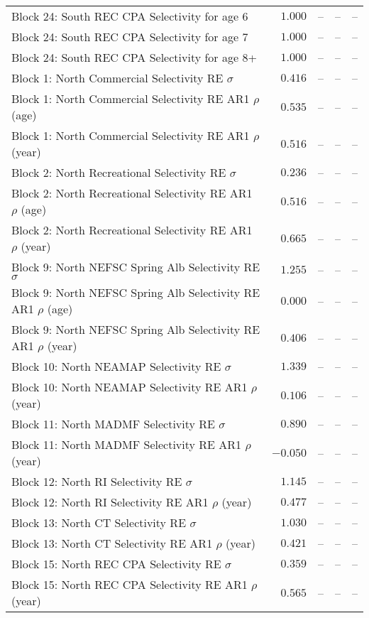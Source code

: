 \documentclass[
]{article}
\begin{document}
\begin{landscape}
\begin{longtable}[t]{lrrrr}
Block 24: South REC CPA Selectivity for age 6 & $1.000$ & -- & -- & --\\
Block 24: South REC CPA Selectivity for age 7 & $1.000$ & -- & -- & --\\
Block 24: South REC CPA Selectivity for age 8+ & $1.000$ & -- & -- & --\\
Block 1: North Commercial Selectivity RE $\sigma$ & $0.416$ & -- & -- & --\\
\addlinespace
Block 1: North Commercial Selectivity RE AR1 $\rho$ (age) & $0.535$ & -- & -- & --\\
Block 1: North Commercial Selectivity RE AR1 $\rho$ (year) & $0.516$ & -- & -- & --\\
Block 2: North Recreational Selectivity RE $\sigma$ & $0.236$ & -- & -- & --\\
Block 2: North Recreational Selectivity RE AR1 $\rho$ (age) & $0.516$ & -- & -- & --\\
Block 2: North Recreational Selectivity RE AR1 $\rho$ (year) & $0.665$ & -- & -- & --\\
\addlinespace
Block 9: North NEFSC Spring Alb Selectivity RE $\sigma$ & $1.255$ & -- & -- & --\\
Block 9: North NEFSC Spring Alb Selectivity RE AR1 $\rho$ (age) & $0.000$ & -- & -- & --\\
Block 9: North NEFSC Spring Alb Selectivity RE AR1 $\rho$ (year) & $0.406$ & -- & -- & --\\
Block 10: North NEAMAP Selectivity RE $\sigma$ & $1.339$ & -- & -- & --\\
Block 10: North NEAMAP Selectivity RE AR1 $\rho$ (year) & $0.106$ & -- & -- & --\\
\addlinespace
Block 11: North MADMF Selectivity RE $\sigma$ & $0.890$ & -- & -- & --\\
Block 11: North MADMF Selectivity RE AR1 $\rho$ (year) & $-0.050$ & -- & -- & --\\
Block 12: North RI Selectivity RE $\sigma$ & $1.145$ & -- & -- & --\\
Block 12: North RI Selectivity RE AR1 $\rho$ (year) & $0.477$ & -- & -- & --\\
Block 13: North CT Selectivity RE $\sigma$ & $1.030$ & -- & -- & --\\
\addlinespace
Block 13: North CT Selectivity RE AR1 $\rho$ (year) & $0.421$ & -- & -- & --\\
Block 15: North REC CPA Selectivity RE $\sigma$ & $0.359$ & -- & -- & --\\
Block 15: North REC CPA Selectivity RE AR1 $\rho$ (year) & $0.565$ & -- & -- & --\\

\end{longtable}
\end{landscape}
\end{document}
